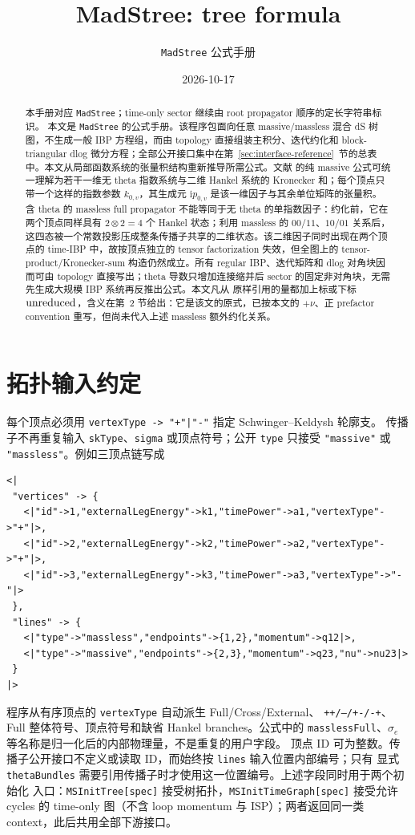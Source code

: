 \documentclass[11pt,a4paper]{ctexart}
\title{MadStree: tree formula}
\author{\texttt{MadStree} 公式手册}
\date{2026-10-17}
\newcommand{\ii}{\mathrm i}
\begin{document}
\maketitle

\begin{abstract}
本手册对应 \texttt{MadStree}；time-only sector 继续由 root propagator 顺序的定长字符串标识。
本文是 \texttt{MadStree} 的公式手册。该程序包面向任意 massive/massless 混合 dS 树图，不生成一般 IBP 方程组，而由 topology 直接组装主积分、迭代约化和 block-triangular dlog 微分方程；全部公开接口集中在第~\ref{sec:interface-reference}~节的总表中。本文从局部函数系统的张量积结构重新推导所需公式。文献 \cite{Chen:2023eic} 的纯 massive 公式可统一理解为若干一维无 theta 指数系统与二维 Hankel 系统的 Kronecker 和；每个顶点只带一个这样的指数参数 $k_{0,v}$，其生成元 $\ii p_{0,v}$ 是该一维因子与其余单位矩阵的张量积。含 theta 的 massless full propagator 不能等同于无 theta 的单指数因子：约化前，它在两个顶点同样具有 $2\otimes2=4$ 个 Hankel 状态；利用 massless 的 $00/11$、$10/01$ 关系后，这四态被一个常数投影压成整条传播子共享的二维状态。该二维因子同时出现在两个顶点的 time-IBP 中，故按顶点独立的 tensor factorization 失效，但全图上的 tensor-product/Kronecker-sum 构造仍然成立。所有 regular IBP、迭代矩阵和 dlog 对角块因而可由 topology 直接写出；theta 导数只增加连接缩并后 sector 的固定非对角块，无需先生成大规模 IBP 系统再反推出公式。本文凡从 \cite{Chen:2023eic} 原样引用的量都加上标或下标 ${\rm unreduced}$，含义在第~2 节给出：它是该文的原式，已按本文的 $+\nu$、正 prefactor convention 重写，但尚未代入上述 massless 额外约化关系。
\end{abstract}

\tableofcontents

\section{拓扑输入约定}
\label{sec:topology-input}

每个顶点必须用 \texttt{vertexType -> "+"|"-"} 指定 Schwinger--Keldysh 轮廓支。
传播子不再重复输入 \texttt{skType}、\texttt{sigma} 或顶点符号；公开
\texttt{type} 只接受 \texttt{"massive"} 或 \texttt{"massless"}。例如三顶点链写成
\begin{verbatim}
<|
 "vertices" -> {
   <|"id"->1,"externalLegEnergy"->k1,"timePower"->a1,"vertexType"->"+"|>,
   <|"id"->2,"externalLegEnergy"->k2,"timePower"->a2,"vertexType"->"+"|>,
   <|"id"->3,"externalLegEnergy"->k3,"timePower"->a3,"vertexType"->"-"|>
 },
 "lines" -> {
   <|"type"->"massless","endpoints"->{1,2},"momentum"->q12|>,
   <|"type"->"massive","endpoints"->{2,3},"momentum"->q23,"nu"->nu23|>
 }
|>
\end{verbatim}
程序从有序顶点的 \texttt{vertexType} 自动派生 Full/Cross/External、
\texttt{++/--/+-/-+}、Full 整体符号、顶点符号和缺省 Hankel branches。公式中的
\texttt{masslessFull}、$\sigma_e$ 等名称是归一化后的内部物理量，不是重复的用户字段。
顶点 ID 可为整数。传播子公开接口不定义或读取 ID，而始终按 \texttt{lines} 输入位置内部编号；只有
显式 \texttt{thetaBundles} 需要引用传播子时才使用这一位置编号。上述字段同时用于两个初始化
入口：\texttt{MSInitTree[spec]} 接受树拓扑，\texttt{MSInitTimeGraph[spec]} 接受允许 cycles 的
time-only 图（不含 loop momentum 与 ISP）；两者返回同一类 context，此后共用全部下游接口。
\end{document}

